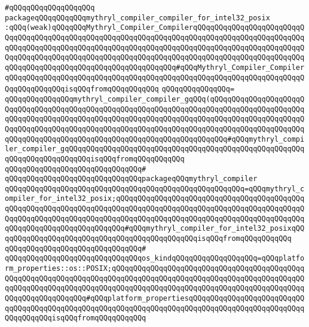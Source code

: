 \verb|#qQQqqQQqqQQqqQQqqQQq|\newline
\verb|packageqQQqqQQqqQQqmythryl_compiler_compiler_for_intel32_posix|\newline
\verb|:qQQq(weak)qQQqqQQqMythryl_Compiler_CompilerqQQqqQQqqQQqqQQqqQQqqQQqqQQqqQQqqQQqqQQqqQQqqQQqqQQqqQQqqQQqqQQqqQQqqQQqqQQqqQQqqQQqqQQqqQQqqQQqqQQqqQQqqQQqqQQqqQQqqQQqqQQqqQQqqQQqqQQqqQQqqQQqqQQqqQQqqQQqqQQqqQQqqQQqqQQqqQQqqQQqqQQqqQQqqQQqqQQqqQQqqQQqqQQqqQQqqQQqqQQqqQQqqQQqqQQqqQQqqQQqqQQqqQQqqQQqqQQqqQQqqQQqqQQqqQQqqQQq#qQQqMythryl_Compiler_CompilerqQQqqQQqqQQqqQQqqQQqqQQqqQQqqQQqqQQqqQQqqQQqqQQqqQQqqQQqqQQqqQQqqQQqqQQqqQQqqQQqqQQqisqQQqfromqQQqqQQqqQQq|\newline
\verb|qQQqqQQqqQQqqQQq=|\newline
\verb|qQQqqQQqqQQqqQQqmythryl_compiler_compiler_gqQQq(qQQqqQQqqQQqqQQqqQQqqQQqqQQqqQQqqQQqqQQqqQQqqQQqqQQqqQQqqQQqqQQqqQQqqQQqqQQqqQQqqQQqqQQqqQQqqQQqqQQqqQQqqQQqqQQqqQQqqQQqqQQqqQQqqQQqqQQqqQQqqQQqqQQqqQQqqQQqqQQqqQQqqQQqqQQqqQQqqQQqqQQqqQQqqQQqqQQqqQQqqQQqqQQqqQQqqQQqqQQqqQQqqQQqqQQqqQQqqQQqqQQqqQQqqQQqqQQqqQQqqQQqqQQqqQQqqQQqqQQqqQQq#qQQqmythryl_compiler_compiler_gqQQqqQQqqQQqqQQqqQQqqQQqqQQqqQQqqQQqqQQqqQQqqQQqqQQqqQQqqQQqqQQqqQQqqQQqqQQqisqQQqfromqQQqqQQqqQQq|\newline
\verb|qQQqqQQqqQQqqQQqqQQqqQQqqQQqqQQq#|\newline
\verb|qQQqqQQqqQQqqQQqqQQqqQQqqQQqqQQqpackageqQQqmythryl_compiler|\newline
\verb|qQQqqQQqqQQqqQQqqQQqqQQqqQQqqQQqqQQqqQQqqQQqqQQqqQQqqQQq=qQQqmythryl_compiler_for_intel32_posix;qQQqqQQqqQQqqQQqqQQqqQQqqQQqqQQqqQQqqQQqqQQqqQQqqQQqqQQqqQQqqQQqqQQqqQQqqQQqqQQqqQQqqQQqqQQqqQQqqQQqqQQqqQQqqQQqqQQqqQQqqQQqqQQqqQQqqQQqqQQqqQQqqQQqqQQqqQQqqQQqqQQqqQQqqQQqqQQqqQQqqQQqqQQqqQQqqQQqqQQqqQQqqQQqqQQq#qQQqmythryl_compiler_for_intel32_posixqQQqqQQqqQQqqQQqqQQqqQQqqQQqqQQqqQQqqQQqqQQqqQQqisqQQqfromqQQqqQQqqQQq|\newline
\verb|qQQqqQQqqQQqqQQqqQQqqQQqqQQqqQQq#|\newline
\verb|qQQqqQQqqQQqqQQqqQQqqQQqqQQqqQQqos_kindqQQqqQQqqQQqqQQqqQQq=qQQqplatform_properties::os::POSIX;qQQqqQQqqQQqqQQqqQQqqQQqqQQqqQQqqQQqqQQqqQQqqQQqqQQqqQQqqQQqqQQqqQQqqQQqqQQqqQQqqQQqqQQqqQQqqQQqqQQqqQQqqQQqqQQqqQQqqQQqqQQqqQQqqQQqqQQqqQQqqQQqqQQqqQQqqQQqqQQqqQQqqQQqqQQqqQQqqQQqqQQqqQQqqQQqqQQqqQQqqQQq#qQQqplatform_propertiesqQQqqQQqqQQqqQQqqQQqqQQqqQQqqQQqqQQqqQQqqQQqqQQqqQQqqQQqqQQqqQQqqQQqqQQqqQQqqQQqqQQqqQQqqQQqqQQqqQQqqQQqqQQqisqQQqfromqQQqqQQqqQQq|\newline
